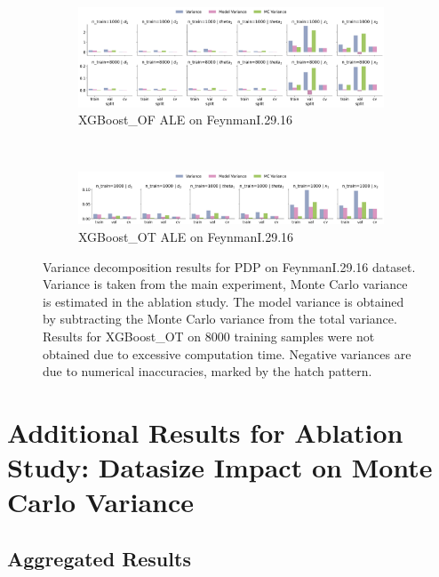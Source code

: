 \documentclass[runningheads]{llncs}
\begin{document}
\begin{figure}[htbp]
    \centering
    \begin{subfigure}[b]{0.9\textwidth}
        \includegraphics[width=\textwidth]{img/FeynmanI.29.16-all/variance_decomposition_ale_XGBoost_OF.png}
        \caption{XGBoost\_OF ALE on FeynmanI.29.16}
    \end{subfigure}
    \\[10pt]
    \vfill
    \begin{subfigure}[b]{0.9\textwidth}
        \includegraphics[width=\textwidth]{img/FeynmanI.29.16-all/variance_decomposition_ale_XGBoost_OT.png}
        \caption{XGBoost\_OT ALE on FeynmanI.29.16}
    \end{subfigure}
    \caption{Variance decomposition results for PDP on FeynmanI.29.16 dataset. Variance is taken from the
        main experiment, Monte Carlo variance is estimated in the ablation study. The model variance is
        obtained by subtracting the Monte Carlo variance from the total variance. Results for XGBoost\_OT
        on 8000 training samples were not obtained due to excessive computation time. Negative variances are
        due to numerical inaccuracies, marked by the hatch pattern.}
    \label{fig:ale-variance-decomp-feynman}  %
\end{figure}

\clearpage
\section{Additional Results for Ablation Study: Datasize Impact on Monte Carlo Variance}\label{app:additional-mc-results}

\subsection{Aggregated Results}
\end{document}
